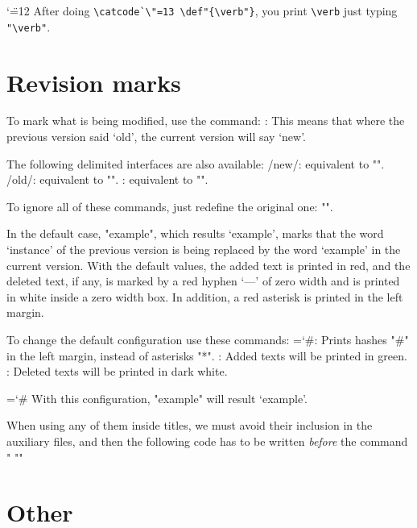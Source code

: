 {\catcode`\"=12
After doing \verb|\catcode`\"=13 \def"{\verb"}|,
you print \verb|\verb| just typing \verb|"\verb"|.}\par


\section{Revision marks}

To mark what is being modified, use the command:
\command{}: This means that where the previous
 version said `old', the current version will say `new'.

\continuepar
The following delimited interfaces are also available:
\command\new/new\wen/: equivalent to "".
\command\del/old\led/: equivalent to "".
\command{}: equivalent to "".

\continuepar
To ignore all of these commands,
just redefine the original one: "\def\diff#1#2{#1}".

In the default case, "\diff{example}{instance}",
which results `\diff{example}{instance}',
marks that the word `instance' of the previous version
is being replaced by the word `example' in the current version.
With the default values, the added text is printed in red,
and the deleted text, if any, is marked
 by a red hyphen `{---\endcolor}' of zero width
 and is printed in white inside a zero width box.
In addition, a red asterisk is printed in the left margin.

To change the default configuration use these commands:
\command\chardef\diffchar=`\#: Prints hashes "#" in the left margin,
 instead of asterisks "*".
\command\def\colornew{Green}: Added texts will be printed
 in green\endcolor.
\command\def\colordel{DarkWhite}: Deleted texts will be printed
 in dark white\endcolor.

\continuepar
\begingroup\chardef\diffchar=`\#\def\colornew{Green}\def\colordel{DarkWhite}%
With this configuration,
"\diff{example}{instance}" will result `\diff{example}{instance}'.
\endgroup

When using any of them inside titles,
we must avoid their inclusion in the auxiliary files,
and then the following code
has to be written {\em before} the command "
"\def\doextrasave{\def\diff##1##2{##1}}"


\section{Other}

